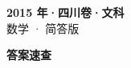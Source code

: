 \documentclass[zihao=-4, a4paper]{ctexart}
\begin{document}
\begin{center}
  {\Large\bfseries 2015 年·四川卷·文科}\\[4pt]
  {\large 数学 · 简答版}
\end{center}
\medskip
{}

\clearpage
{}
\begin{center}{\Large\bfseries 答案速查}\end{center}
\medskip

\end{document}
